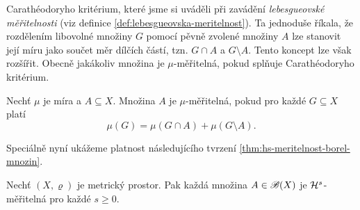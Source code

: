 Carathéodoryho kritérium, které jsme si uváděli při zavádění \emph{lebesgueovské měřitelnosti} (viz definice \ref{def:lebesgueovska-meritelnost}). Ta jednoduše říkala, že rozdělením libovolné množiny $G$ pomocí pěvně zvolené množiny $A$ lze stanovit její míru jako součet měr dílčích částí, tzn. $G\cap A$ a $G\setminus A$. Tento koncept lze však rozšířit. Obecně jakákoliv množina je $\mu$-měřitelná, pokud splňuje Carathéodoryho kritérium.
\begin{definition}\label{def:meritelnost}
    Nechť $\mu$ je míra a $A\subseteq X$. Množina $A$ je $\mu$-měřitelná, pokud pro každé $G\subseteq X$ platí
    \[\mu(G)=\mu(G\cap A)+\mu(G\setminus A).\]
\end{definition}
Speciálně nyní ukážeme platnost následujícího tvrzení \ref{thm:hs-meritelnost-borel-mnozin}.
\begin{theorem}\label{thm:hs-meritelnost-borel-mnozin}
    Nechť $(X,\varrho)$ je metrický prostor. Pak každá množina $A\in\mathscr{B}(X)$ je $\mathcal{H}^{s}$-měřitelná pro každé $s\geqslant 0$.
\end{theorem}
